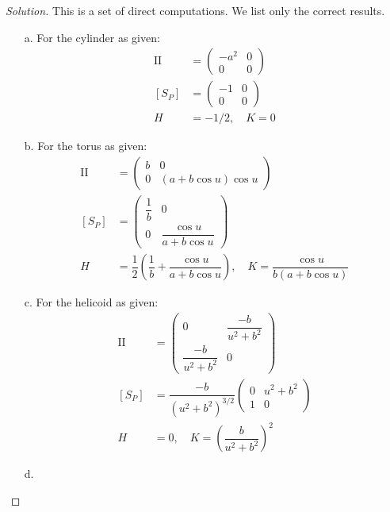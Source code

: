 \documentclass[Shifrin_Solutions_Spring_2018]{subfiles}
\begin{document}
\begin{proof}[Solution] This is a set of direct computations. We list only the correct results.
\begin{itemize}
\item[a.] For the cylinder as given:
\begin{align*}
\mathrm{II} & = \begin{pmatrix} -a^2 & 0 \\ 0 & 0 \end{pmatrix} \\
\left[S_P\right] & = \begin{pmatrix} -1 & 0 \\ 0 & 0 \end{pmatrix} \\
H & = -1/2, \quad K = 0
\end{align*}

\item[b.] For the torus as given:
\begin{align*}
\mathrm{II} & = \begin{pmatrix} b & 0 \\ 0 & (a+b\cos u) \cos u \end{pmatrix} \\
\left[S_P\right] & = \begin{pmatrix} \dfrac{1}{b} & 0 \\ 0 & \dfrac{\cos u}{a+b\cos u} \end{pmatrix} \\
H & = \dfrac{1}{2}\left( \dfrac{1}{b} + \dfrac{\cos u}{a+b\cos u}\right), \quad K = \dfrac{\cos u}{b(a+b\cos u)}
\end{align*}

\item[c.] For the helicoid as given:
\begin{align*}
\mathrm{II} & = \begin{pmatrix} 0 & \dfrac{-b}{u^2+b^2} \\ \dfrac{-b}{u^2+b^2} & 0  \end{pmatrix} \\
\left[S_P\right] & =\dfrac{-b}{(u^2+b^2)^{3/2}} \begin{pmatrix}  0 & u^2+b^2 \\ 1 & 0 \end{pmatrix} \\
H & = 0, \quad K = \left( \dfrac{b}{u^2+b^2} \right)^2
\end{align*}

\item[d.]


\end{itemize}
\end{proof}
\end{document}
